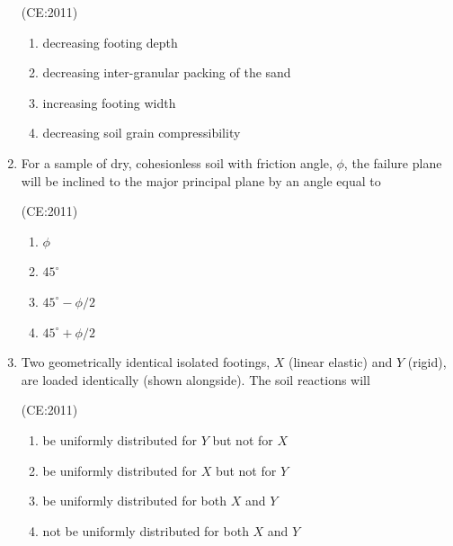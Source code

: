 \documentclass[journal,12pt,onecolumn]{IEEEtran}
\theoremstyle{remark}
\begin{document}
\begin{enumerate}
    \hfill{(CE:2011)}
        \begin{enumerate}
            \item decreasing footing depth
            \item decreasing inter-granular packing of the sand
            \item increasing footing width
            \item decreasing soil grain compressibility
        \end{enumerate}
\vspace{1cm}
    \item For a sample of dry, cohesionless soil with friction angle, $\phi$, the failure plane will be inclined to the major principal plane by an angle equal to

    \hfill{(CE:2011)}
    \begin{multicols}{4}
        \begin{enumerate}
            \item $\phi$
            \item $45^\circ$
            \item $45^\circ - \phi / 2$
            \item $45^\circ + \phi / 2$
        \end{enumerate}
    \end{multicols}
\vspace{1cm}
    \item Two geometrically identical isolated footings, $X$ (linear elastic) and $Y$ (rigid), are loaded identically (shown alongside). The soil reactions will
	    \newpage
	    \begin{center}
	    
	    \end{center}
    \hfill{(CE:2011)}
    \begin{multicols}{2}
        \begin{enumerate}
            \item be uniformly distributed for $Y$ but not for $X$
            \item be uniformly distributed for $X$ but not for $Y$
            \item be uniformly distributed for both $X$ and $Y$
            \item not be uniformly distributed for both $X$ and $Y$
        \end{enumerate}
    \end{multicols}

\end{enumerate}
\end{document}
